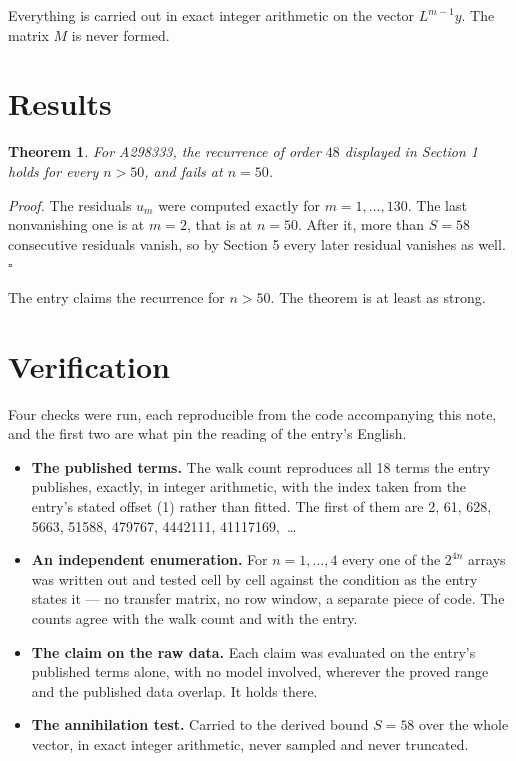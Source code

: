 \documentclass[11pt]{article}
\newtheorem{theorem}{Theorem}
\theoremstyle{definition}
\begin{document}
Everything is carried out in exact integer arithmetic on the vector $L^{m-1}y$. The matrix $M$ is never formed.

\section{Results}

\begin{theorem} For A298333, the recurrence of order $48$ displayed in Section 1 holds for every $n > 50$, and fails at $n = 50$.\end{theorem}

{\itshape Proof.} The residuals $u_m$ were computed exactly for $m = 1,\dots,130$. The last nonvanishing one is at $m = 2$, that is at $n = 50$. After it, more than $S = 58$ consecutive residuals vanish, so by Section 5 every later residual vanishes as well. $\square$

The entry claims the recurrence for $n > 50$. The theorem is at least as strong.

\section{Verification}

Four checks were run, each reproducible from the code accompanying this note, and the first two are what pin the reading of the entry's English.

\begin{itemize}

\item {\bfseries The published terms.} The walk count reproduces all 18 terms the entry publishes, exactly, in integer arithmetic, with the index taken from the entry's stated offset (1) rather than fitted. The first of them are 2, 61, 628, 5663, 51588, 479767, 4442111, 41117169,~\dots

\item {\bfseries An independent enumeration.} For $n = 1,\dots,4$ every one of the $2^{4n}$ arrays was written out and tested cell by cell against the condition as the entry states it --- no transfer matrix, no row window, a separate piece of code. The counts agree with the walk count and with the entry.

\item {\bfseries The claim on the raw data.} Each claim was evaluated on the entry's published terms alone, with no model involved, wherever the proved range and the published data overlap. It holds there.

\item {\bfseries The annihilation test.} Carried to the derived bound $S = 58$ over the whole vector, in exact integer arithmetic, never sampled and never truncated.

\end{itemize}
\end{document}
